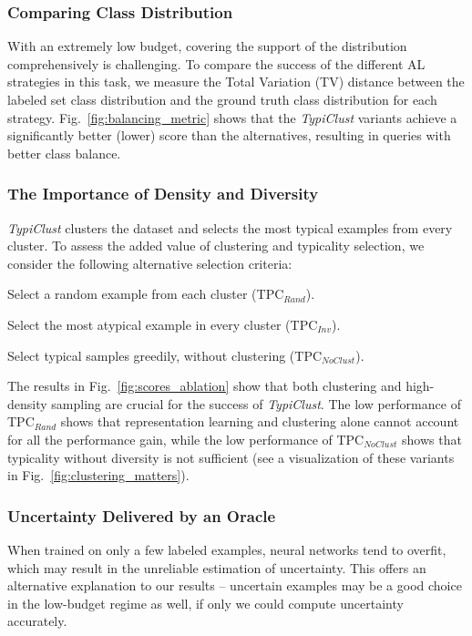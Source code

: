 \documentclass{article}
\begin{document}
\subsubsection{Comparing Class Distribution}
\label{sec:class_balancing}
With an extremely low budget, covering the support of the distribution comprehensively is challenging. To compare the success of the different AL strategies in this task, we measure the Total Variation (TV) distance between the labeled set class distribution and the ground truth class distribution for each strategy. Fig.~\ref{fig:balancing_metric} shows that the \emph{TypiClust} variants achieve a significantly better (lower) score than the alternatives, resulting in queries with better class balance.


\subsubsection{The Importance of Density and Diversity}
\label{sec:abb-denisity}
\emph{TypiClust} clusters the dataset and selects the most typical examples from every cluster. To assess the added value of clustering and typicality selection, we consider the following alternative selection criteria:
\begin{inparaenum}[(a)]
    \item Select a random example from each cluster (TPC$_{Rand}$).
    \item Select the most atypical example in every cluster (TPC$_{Inv}$).
    \item Select typical samples greedily, without clustering (TPC$_{NoClust}$).
\end{inparaenum}

The results in Fig.~\ref{fig:scores_ablation} show that both clustering and high-density sampling are crucial for the success of \emph{TypiClust}. The low performance of TPC$_{Rand}$ shows that representation learning and clustering alone cannot account for all the performance gain, while the low performance of TPC$_{NoClust}$ shows that typicality without diversity is not sufficient (see a  visualization of these variants in Fig.~\ref{fig:clustering_matters}).

\subsubsection{Uncertainty Delivered by an Oracle}
\label{sec:ablation_oracle_uncertainty}

When trained on only a few labeled examples, neural networks tend to overfit, which may result in the unreliable estimation of uncertainty. This offers an alternative explanation to our results -- uncertain examples may be a good choice in the low-budget regime as well, if only we could compute uncertainty accurately.
\end{document}
